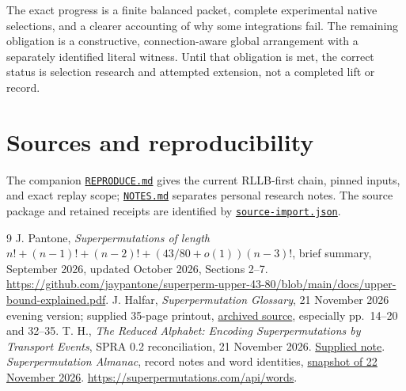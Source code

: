\documentclass[11pt]{article}
\begin{document}
The exact progress is a finite balanced packet, complete experimental
native selections, and a clearer accounting of why some integrations fail.
The remaining obligation is a constructive, connection-aware global
arrangement with a separately identified literal witness. Until that
obligation is met, the correct status is selection research and attempted
extension, not a completed lift or record.

\section*{Sources and reproducibility}
The companion \href{REPRODUCE.md}{\texttt{REPRODUCE.md}} gives the current
RLLB-first chain, pinned inputs, and exact replay scope;
\href{NOTES.md}{\texttt{NOTES.md}} separates personal research notes.
The source package and retained receipts are identified by
\href{source-import.json}{\texttt{source-import.json}}.

\begin{thebibliography}{9}\footnotesize
\setlength{\itemsep}{2pt}
 J. Pantone,
\emph{Superpermutations of length
$n!+(n-1)!+(n-2)!+(43/80+o(1))(n-3)!$}, brief summary,
September 2026, updated October 2026, Sections 2--7.
\url{https://github.com/jaypantone/superperm-upper-43-80/blob/main/docs/upper-bound-explained.pdf}.
 J. Halfar, \emph{Superpermutation Glossary},
21 November 2026 evening version; supplied 35-page printout,
\href{../../rllb/sources/Glossary.pdf}{archived source}, especially pp.~14--20 and 32--35.
 T. H., \emph{The Reduced Alphabet: Encoding Superpermutations
by Transport Events}, SPRA 0.2 reconciliation, 21 November 2026.
\href{../../rllb/sources/the-reduced-alphabet-spra-0.2-reconciled.md}{Supplied note}.
 \emph{Superpermutation Almanac}, record notes and word identities,
\href{../../rllb/almanac-snapshot.json}{snapshot of 22 November 2026}.
\url{https://superpermutations.com/api/words}.
\end{thebibliography}
\end{document}
